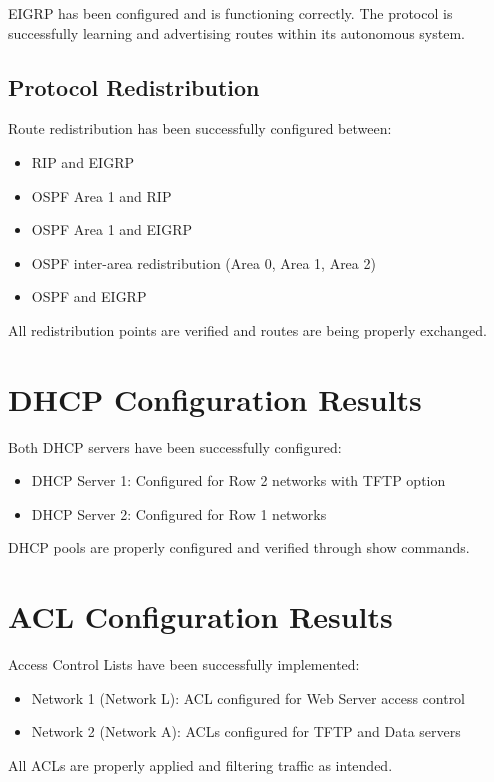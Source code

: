 \documentclass[12pt,a4paper]{report}
\begin{document}
EIGRP has been configured and is functioning correctly. The protocol is successfully learning and advertising routes within its autonomous system.

\subsection{Protocol Redistribution}

Route redistribution has been successfully configured between:
\begin{itemize}
    \item RIP and EIGRP
    \item OSPF Area 1 and RIP
    \item OSPF Area 1 and EIGRP
    \item OSPF inter-area redistribution (Area 0, Area 1, Area 2)
    \item OSPF and EIGRP
\end{itemize}

All redistribution points are verified and routes are being properly exchanged.

\section{DHCP Configuration Results}

Both DHCP servers have been successfully configured:
\begin{itemize}
    \item DHCP Server 1: Configured for Row 2 networks with TFTP option
    \item DHCP Server 2: Configured for Row 1 networks
\end{itemize}

DHCP pools are properly configured and verified through show commands.

\section{ACL Configuration Results}

Access Control Lists have been successfully implemented:
\begin{itemize}
    \item Network 1 (Network L): ACL configured for Web Server access control
    \item Network 2 (Network A): ACLs configured for TFTP and Data servers
\end{itemize}

All ACLs are properly applied and filtering traffic as intended.
\end{document}
